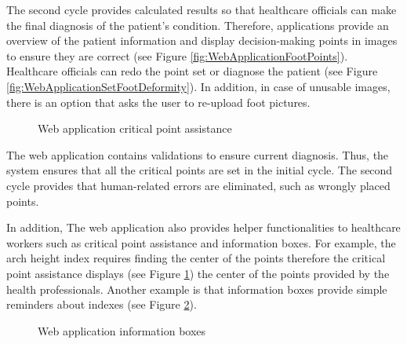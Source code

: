 The second cycle provides calculated results so that healthcare officials can make the final diagnosis of the patient's condition. Therefore, applications provide an overview of the patient information and display decision-making points in images to ensure they are correct (see Figure \ref{fig:WebApplicationFootPoints}). Healthcare officials can redo the point set or diagnose the patient (see Figure \ref{fig:WebApplicationSetFootDeformity}). In addition, in case of unusable images, there is an option that asks the user to re-upload foot pictures.

\begin{figure}[htbp]
\centering
{}
\caption{Web application critical point assistance}
\label{fig:WebApplicationCriticalPointAssistance}
\end{figure}

The web application contains validations to ensure current diagnosis. Thus, the system ensures that all the critical points are set in the initial cycle. The second cycle provides that human-related errors are eliminated, such as wrongly placed points. 

In addition, The web application also provides helper functionalities to healthcare workers such as critical point assistance and information boxes. For example, the arch height index requires finding the center of the points therefore the critical point assistance displays (see Figure \ref{fig:WebApplicationCriticalPointAssistance}) the center of the points provided by the health professionals. Another example is that information boxes provide simple reminders about indexes (see Figure \ref{fig:WebApplicationInformationBoxes}).

\begin{figure}[htbp]
\centering
{}
\caption{Web application information boxes}
\label{fig:WebApplicationInformationBoxes}
\end{figure}

